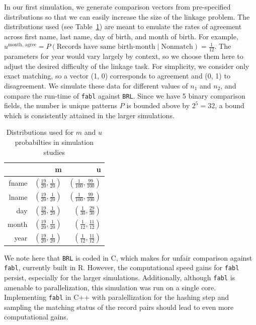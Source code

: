 \documentclass[ba]{imsart}
\begin{document}
In our first simulation, we generate comparison vectors from pre-specified distributions so that we can easily increase the size of the linkage problem. The distributions used (see Table~\ref{Tab:distributions}) are meant to emulate the rates of agreement across first name, last name, day of birth, and month of birth.  For example, $u^{\text{month, agree}} = P(\text{Records have same birth-month} \mid \text{Nonmatch}) = \frac{1}{12}$. The parameters for year would vary largely by context, so we choose them here to adjust the desired difficulty of the linkage task. For simplicity, we consider only exact matching, so a vector (1, 0) corresponds to agreement and (0, 1) to disagreement. We simulate these data for different values of \(n_1\) and \(n_2\), and compare the run-time of \texttt{fabl} against \texttt{BRL}. Since we have 5 binary comparison fields, the number is unique patterns \(P\) is bounded above by \(2^5 = 32\), a bound which is consistently attained in the larger simulations.

\begin{table}[t]
	\centering
	\begin{tabular}{rrr}
		\hline
		& m & u \\ 
		\hline
		fname & $\left(\frac{19}{20}, \frac{1}{20}\right)$ & $\left(\frac{1}{100}, \frac{99}{100}\right)$ \\ 
		lname & $\left(\frac{19}{20}, \frac{1}{20}\right)$ & $\left(\frac{1}{100}, \frac{99}{100}\right)$ \\ 
		day & $\left(\frac{19}{20}, \frac{1}{20}\right)$ & $\left(\frac{1}{30}, \frac{29}{30}\right)$ \\ 
		month & $\left(\frac{19}{20}, \frac{1}{20}\right)$ & $\left(\frac{1}{12}, \frac{11}{12}\right)$ \\ 
		year & $\left(\frac{19}{20}, \frac{1}{20}\right)$ & $\left(\frac{1}{12}, \frac{11}{12}\right)$ \\ 
		\hline
	\end{tabular}
	\caption{Distributions used for $m$ and $u$ probabilties in simulation studies}\label{Tab:distributions}
\end{table}

We note here that \texttt{BRL} is coded in C, which makes for unfair
comparison against \texttt{fabl}, currently built in R. However, the computational speed gains for \texttt{fabl} persist, especially for the larger simulations.  Additionally, although \texttt{fabl} is amenable to parallelization, this simulation was run on a single core. Implementing \texttt{fabl} in C++ with paralellization for the hashing step and sampling the matching status of the record pairs should lead to even more computational gains.
\end{document}
